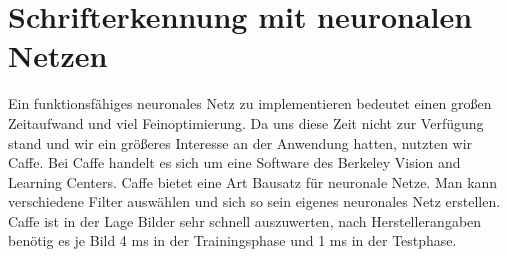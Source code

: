 \section{Schrifterkennung mit neuronalen Netzen}

Ein funktionsfähiges neuronales Netz zu implementieren bedeutet einen großen Zeitaufwand und viel Feinoptimierung. Da uns diese Zeit nicht zur Verfügung stand und wir ein größeres Interesse an der Anwendung hatten, nutzten wir Caffe. Bei Caffe handelt es sich um eine Software des Berkeley Vision and Learning Centers. Caffe bietet eine Art Bausatz für neuronale Netze. Man kann verschiedene Filter auswählen und sich so sein eigenes neuronales Netz erstellen. Caffe ist in der Lage Bilder sehr schnell auszuwerten, nach Herstellerangaben benötig es je Bild 4 ms in der Trainingsphase und 1 ms in der Testphase.